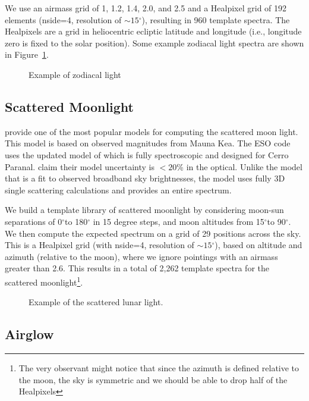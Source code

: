 \documentclass{emulateapj}  %
\newcommand\degree{{^\circ}}
\begin{document}
We use an airmass grid of 1, 1.2, 1.4, 2.0, and 2.5 and a Healpixel grid of 192 elements (nside=4, resolution of $\sim15\degree$), resulting in 960 template spectra.  The Healpixels are a grid in heliocentric ecliptic latitude and longitude (i.e., longitude zero is fixed to the solar position).  Some example zodiacal light spectra are shown in Figure~\ref{fig:zodiacal}. 

\begin{figure}
  \caption{Example of zodiacal light \label{fig:zodiacal}}
\end{figure}


\subsection{Scattered Moonlight}

\citet{Krisciunas91} provide one of the most popular models for computing the scattered moon light. This model is based on observed magnitudes from Mauna Kea. The ESO code uses the updated model of \citet{Jones13} which is fully spectroscopic and designed for Cerro Paranal. \citet{Jones13} claim their model uncertainty is $<20$\% in the optical.  Unlike the \citet{Krisciunas91} model that is a fit to observed broadband sky brightnesses, the \citet{Jones13} model uses fully 3D single scattering calculations and provides an entire spectrum.

We build a template library of scattered moonlight by considering moon-sun separations of 0$\degree$to 180$\degree$ in 15 degree steps, and moon altitudes from 15$\degree$to 90$\degree$.  We then compute the expected spectrum on a grid of 29 positions across the sky. This is a Healpixel grid (with nside=4, resolution of $\sim15\degree$), based on altitude and azimuth (relative to the moon), where we ignore pointings with an airmass greater than 2.6. This results in a total of 2,262 template spectra for the scattered moonlight\footnote{The very observant might notice that since the azimuth is defined relative to the moon, the sky is symmetric and we should be able to drop half of the Healpixels}.

\begin{figure}
  \caption{Example of the scattered lunar light. \label{fig:moon}}
\end{figure}


\subsection{Airglow}
\end{document}
